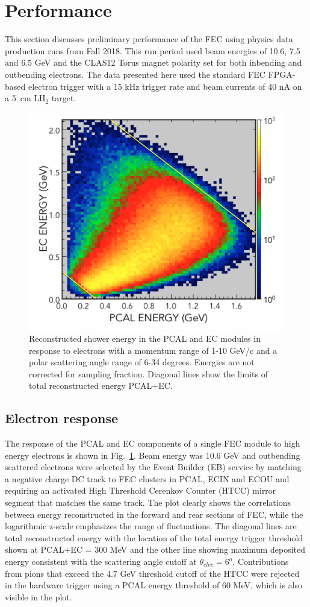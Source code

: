 \section{Performance}

This section discusses preliminary performance of the FEC using physics data production runs from Fall 2018.  This run period used beam energies of 10.6, 7.5 and 6.5 GeV and the CLAS12 Torus magnet polarity set for both inbending and outbending electrons.  The data presented here used the standard FEC FPGA-based electron trigger with a 15 kHz trigger rate and beam currents of 40 nA on a 5~cm LH$_2$ target.

\begin{figure}[hbt]
\centering
\includegraphics[width=0.8\columnwidth,keepaspectratio]{img/S10_1_000.png}
\caption[]{Reconstructed shower energy in the PCAL and EC modules in response to electrons with a momentum range of 1-10 GeV/c and a polar scattering angle range of 6-34 degrees.  Energies are not corrected for sampling fraction. Diagonal lines show the limits of total reconstructed energy PCAL+EC.}
\label{fig:S10_1_000}
\end{figure}

\subsection{Electron response}
The response of the PCAL and EC components of a single FEC module to high energy electrons is shown in Fig.~\ref{fig:S10_1_000}.  Beam energy was 10.6 GeV and outbending scattered electrons were selected by the Event Builder (EB) service by matching a negative charge DC track to FEC clusters in PCAL, ECIN and ECOU and requiring an activated High Threshold Cerenkov Counter (HTCC) mirror segment that matches the same track.  The plot clearly shows the correlations between energy reconstructed in the forward and rear sections of FEC, while the logarithmic z-scale emphasizes the range of fluctuations. The diagonal lines are total reconstructed  energy with the location of the total energy trigger threshold shown at PCAL+EC = 300 MeV and the other line showing maximum deposited energy consistent with the scattering angle cutoff at $\theta_{elec}=6^o$. Contributions from pions that exceed the 4.7 GeV threshold cutoff of the HTCC were rejected in the hardware trigger using a PCAL energy threshold of 60 MeV, which is also visible in the plot.

